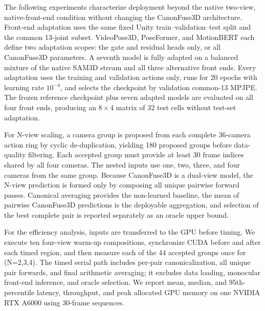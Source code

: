 The following experiments characterize deployment beyond the native two-view, native-front-end condition without changing the CanonFuse3D architecture. Front-end adaptation uses the same fixed Unity train--validation--test split and the common 13-joint subset. VideoPose3D, PoseFormer, and MotionBERT each define two adaptation scopes: the gate and residual heads only, or all CanonFuse3D parameters. A seventh model is fully adapted on a balanced mixture of the native SAM3D stream and all three alternative front ends. Every adaptation uses the training and validation actions only, runs for 20 epochs with learning rate \(10^{-4}\), and selects the checkpoint by validation common-13 MPJPE. The frozen reference checkpoint plus seven adapted models are evaluated on all four front ends, producing an \(8\times4\) matrix of 32 test cells without test-set adaptation.

For N-view scaling, a camera group is proposed from each complete 36-camera action ring by cyclic de-duplication, yielding 180 proposed groups before data-quality filtering. Each accepted group must provide at least 30 frame indices shared by all four cameras. The nested inputs use one, two, three, and four cameras from the same group. Because CanonFuse3D is a dual-view model, the N-view prediction is formed only by composing all unique pairwise forward passes. Canonical averaging provides the non-learned baseline, the mean of pairwise CanonFuse3D predictions is the deployable aggregation, and selection of the best complete pair is reported separately as an oracle upper bound.

For the efficiency analysis, inputs are transferred to the GPU before timing. We execute ten four-view warm-up compositions, synchronize CUDA before and after each timed region, and then measure each of the 44 accepted groups once for (N=2,3,4). The timed serial path includes per-pair canonicalization, all unique pair forwards, and final arithmetic averaging; it excludes data loading, monocular front-end inference, and oracle selection. We report mean, median, and 95th-percentile latency, throughput, and peak allocated GPU memory on one NVIDIA RTX A6000 using 30-frame sequences.

